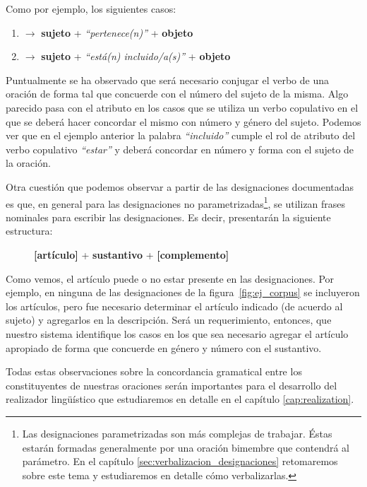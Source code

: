 \noindent
Como por ejemplo, los siguientes casos:

\bigskip
\begin{enumerate}
 \item {} $\rightarrow$ \textbf{sujeto} + \emph{``pertenece(n)''} + \textbf{objeto}
 \item {} $\rightarrow$ \textbf{sujeto} + \emph{``está(n) incluido/a(s)''} + \textbf{objeto}
\end{enumerate}

\bigskip
Puntualmente se ha observado que será necesario conjugar el verbo de una oración de forma tal que concuerde con el número del sujeto de la misma. Algo parecido pasa con el atributo en los casos que se utiliza un verbo copulativo en el que se deberá hacer concordar el mismo con número y género del sujeto. Podemos ver que en el ejemplo anterior la palabra \emph{``incluido''} cumple el rol de atributo del verbo copulativo \emph{``estar''} y deberá concordar en número y forma con el sujeto de la oración. 


Otra cuestión que podemos observar a partir de las designaciones documentadas es que, en general para las designaciones no parametrizadas\footnote{Las designaciones parametrizadas son más complejas de trabajar. Éstas estarán formadas generalmente por una oración bimembre que contendrá al parámetro. En el capítulo \ref{sec:verbalizacion_designaciones} retomaremos sobre este tema y estudiaremos en detalle cómo verbalizarlas.}, se utilizan frases nominales para escribir las designaciones. Es decir, presentarán la siguiente estructura:

\begin{figure}[H]
\center
\textbf{[artículo]} + \textbf{sustantivo} + \textbf{[complemento]}
\end{figure}

Como vemos, el artículo puede o no estar presente en las designaciones. Por ejemplo, en ninguna de las designaciones de la figura~\ref{fig:ej_corpus} se incluyeron los artículos, pero fue necesario determinar el artículo indicado (de acuerdo al sujeto) y agregarlos en la descripción. Será un requerimiento, entonces, que nuestro sistema identifique los casos en los que sea necesario agregar el artículo apropiado de forma que concuerde en género y número con el sustantivo. 

Todas estas observaciones sobre la concordancia gramatical entre los constituyentes de nuestras oraciones serán importantes para el desarrollo del realizador lingüístico que estudiaremos en detalle en el capítulo \ref{cap:realization}.

